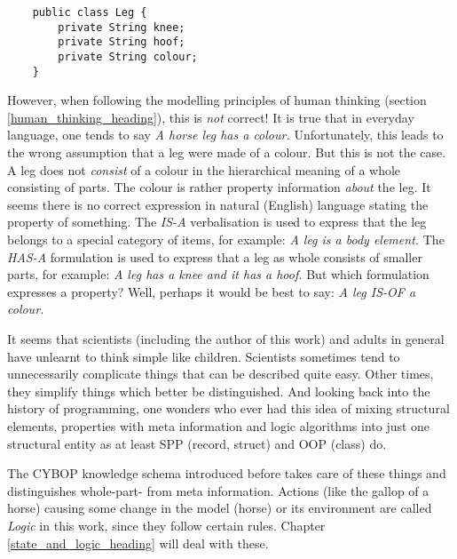 \begin{scriptsize}
    \begin{verbatim}
    public class Leg {
        private String knee;
        private String hoof;
        private String colour;
    }
    \end{verbatim}
\end{scriptsize}

However, when following the modelling principles of human thinking (section
\ref{human_thinking_heading}), this is \emph{not} correct! It is true that in
everyday language, one tends to say \textit{A horse leg \emph{has a} colour.}
Unfortunately, this leads to the wrong assumption that a leg were made of a
colour. But this is not the case. A leg does not \emph{consist} of a colour in
the hierarchical meaning of a whole consisting of parts. The colour is rather
property information \emph{about} the leg. It seems there is no correct
expression in natural (English) language stating the property of something. The
\emph{IS-A} verbalisation is used to express that the leg belongs to a special
category of items, for example: \textit{A leg is a body element.} The
\emph{HAS-A} formulation is used to express that a leg as whole consists of
smaller parts, for example: \textit{A leg has a knee and it has a hoof.} But
which formulation expresses a property? Well, perhaps it would be best to say:
\textit{A leg IS-OF a colour.}

It seems that scientists (including the author of this work) and adults in
general have unlearnt to think simple like children. Scientists sometimes tend
to unnecessarily complicate things that can be described quite easy. Other
times, they simplify things which better be distinguished. And looking back
into the history of programming, one wonders who ever had this idea of mixing
structural elements, properties with meta information and logic algorithms into
just one structural entity as at least SPP (record, struct) and OOP (class) do.

The CYBOP knowledge schema introduced before takes care of these things and
distinguishes whole-part- from meta information. Actions (like the gallop of a
horse) causing some change in the model (horse) or its environment are called
\emph{Logic} in this work, since they follow certain rules. Chapter
\ref{state_and_logic_heading} will deal with these.
